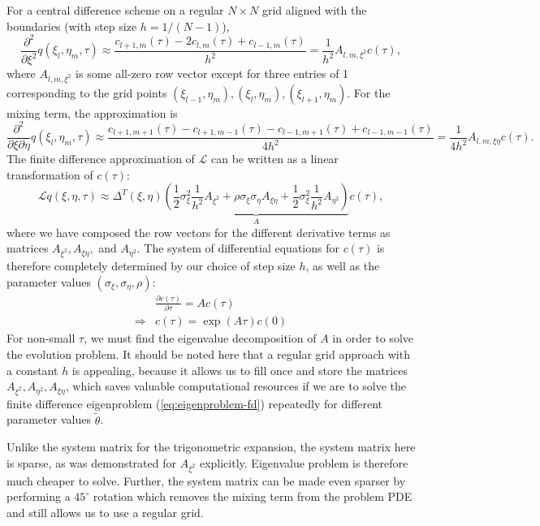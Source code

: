 \documentclass[10pt]{article}
\begin{document}
For a central difference scheme on a regular $N \times N$ grid aligned
with the boundaries (with step size $h=1/(N-1)$), 
\[
  \frac{\partial^2}{\partial \xi^2} q(\xi_l, \eta_m, \tau) \approx
  \frac{c_{l+1,m}(\tau) - 2c_{l,m}(\tau) + c_{l-1,m}(\tau)}{h^2} = \frac{1}{h^2}A_{l,m,\xi^2} c(\tau),
\]
where $A_{l,m,\xi^2}$ is some all-zero row vector except for three
entries of 1 corresponding to the grid points
$(\xi_{l-1}, \eta_m), (\xi_l,\eta_m), (\xi_{l+1},\eta_m)$. For the
mixing term, the approximation is
\[
  \frac{\partial^2}{\partial \xi \partial \eta} q(\xi_l, \eta_m, \tau) \approx
  \frac{c_{l+1,m+1}(\tau) - c_{l+1,m-1}(\tau) - c_{l-1,m+1}(\tau) + c_{l-1,m-1}(\tau)}{4h^2} = \frac{1}{4h^2}A_{l,m,\xi\eta} c(\tau).
\]
The finite difference approximation of $\mathcal{L}$ can be written as
a linear transformation of $c(\tau)$:
\[
  \mathcal{L}q(\xi,\eta,\tau) \approx \Delta^T(\xi,\eta) \underbrace{\left( \frac{1}{2}\sigma_\xi^2 \frac{1}{h^2}A_{\xi^2} + \rho\sigma_\xi\sigma_\eta A_{\xi\eta} + \frac{1}{2}\sigma_\xi^2 \frac{1}{h^2}A_{\eta^2}  \right)}_{A} c(\tau),
\]
where we have composed the row vectors for the different derivative
terms as matrices $A_{\xi^2}, A_{\xi\eta},$ and $A_{\eta^2}$. The
system of differential equations for $c(\tau)$ is therefore completely
determined by our choice of step size $h$, as well as the parameter
values $(\sigma_\xi, \sigma_\eta, \rho)$:
\begin{align}
   &\frac{\partial c(\tau)}{\partial \tau} = A c(\tau) \nonumber \\
   \Rightarrow &c(\tau) = \exp\left( A\tau \right)c(0) \label{eq:eigenproblem-fd}
\end{align}
For non-small $\tau$, we must find the eigenvalue decomposition of $A$
in order to solve the evolution problem. It should be noted here that
a regular grid approach with a constant $h$ is appealing, because it
allows us to fill once and store the matrices
$A_{\xi^2}, A_{\eta^2}, A_{\xi\eta}$, which saves valuable
computational resources if we are to solve the finite difference
eigenproblem (\ref{eq:eigenproblem-fd}) repeatedly for different
parameter values $\tilde{\theta}$.

Unlike the system matrix for the trigonometric expansion, the system
matrix here is sparse, as was demonstrated for $A_{\xi^2}$ explicitly.
Eigenvalue problem is therefore much cheaper to solve. Further, the
system matrix can be made even sparser by performing a $45^{\circ}$
rotation which removes the mixing term from the problem PDE and still
allows us to use a regular grid.
\end{document}
